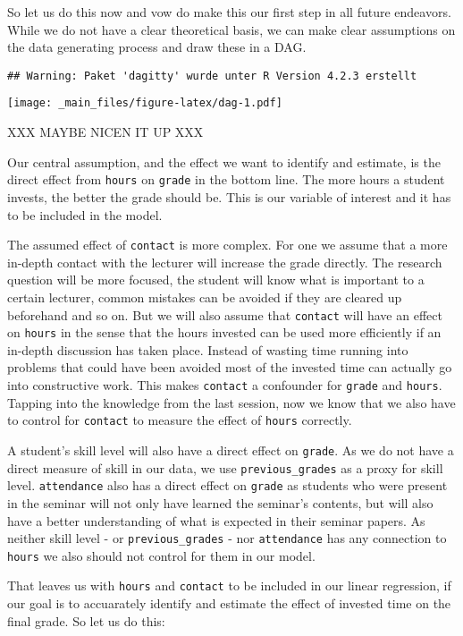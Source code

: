 \documentclass[
]{book}
\begin{document}
So let us do this now and vow do make this our first step in all future
endeavors. While we do not have a clear theoretical basis, we can make clear
assumptions on the data generating process and draw these in a DAG.

\begin{verbatim}
## Warning: Paket 'dagitty' wurde unter R Version 4.2.3 erstellt
\end{verbatim}

\texttt{[image: \_main\_files/figure-latex/dag-1.pdf]}

XXX MAYBE NICEN IT UP XXX

Our central assumption, and the effect we want to identify and estimate, is the
direct effect from \texttt{hours} on \texttt{grade} in the bottom line. The more hours a
student invests, the better the grade should be. This is our variable of
interest and it has to be included in the model.

The assumed effect of \texttt{contact} is more complex. For one we assume that a more
in-depth contact with the lecturer will increase the grade directly. The
research question will be more focused, the student will know what is important
to a certain lecturer, common mistakes can be avoided if they are cleared up
beforehand and so on. But we will also assume that \texttt{contact} will have an effect
on \texttt{hours} in the sense that the hours invested can be used more efficiently if
an in-depth discussion has taken place. Instead of wasting time running into
problems that could have been avoided most of the invested time can actually go
into constructive work. This makes \texttt{contact} a confounder for \texttt{grade} and
\texttt{hours}. Tapping into the knowledge from the last session, now we know that we
also have to control for \texttt{contact} to measure the effect of \texttt{hours} correctly.

A student's skill level will also have a direct effect on \texttt{grade}. As we do not
have a direct measure of skill in our data, we use \texttt{previous\_grades} as a proxy
for skill level. \texttt{attendance} also has a direct effect on \texttt{grade} as students
who were present in the seminar will not only have learned the seminar's
contents, but will also have a better understanding of what is expected in their
seminar papers. As neither skill level - or \texttt{previous\_grades} - nor \texttt{attendance}
has any connection to \texttt{hours} we also should not control for them in our model.

That leaves us with \texttt{hours} and \texttt{contact} to be included in our linear
regression, if our goal is to accuarately identify and estimate the effect of
invested time on the final grade. So let us do this:
\end{document}
